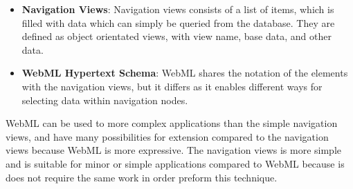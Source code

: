 \begin{itemize}
\item \textbf{Navigation Views}: Navigation views consists of a list of items, which is filled with data which can simply be queried from the database. They are defined as object orientated views, with view name, base data, and other data.
\item \textbf{WebML Hypertext Schema}: WebML shares the notation of the elements with the navigation views, but it differs as it enables different ways for selecting data within navigation nodes.
\end{itemize}

WebML can be used to more complex applications than the simple navigation views, and have many possibilities for extension compared to the navigation views because WebML is more expressive. The navigation views is more simple and is suitable for minor or simple applications compared to WebML because is does not require the same work in order preform this technique.